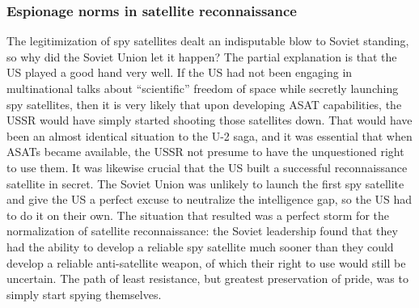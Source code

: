 \documentclass[14pt]{extarticle}
\begin{document}
\subsubsection{Espionage norms in satellite reconnaissance}
The legitimization of spy satellites dealt an indisputable blow to Soviet standing, so why did the Soviet Union let it happen? The partial explanation is that the US played a good hand very well. If the US had not been engaging in multinational talks about \enquote{scientific} freedom of space while secretly launching spy satellites, then it is very likely that upon developing ASAT capabilities, the USSR would have simply started shooting those satellites down. That would have been an almost identical situation to the U-2 saga, and it was essential that when ASATs became available, the USSR not presume to have the unquestioned right to use them. It was likewise crucial that the US built a successful reconnaissance satellite in secret. The Soviet Union was unlikely to launch the first spy satellite and give the US a perfect excuse to neutralize the intelligence gap, so the US had to do it on their own. The situation that resulted was a perfect storm for the normalization of satellite reconnaissance: the Soviet leadership found that they had the ability to develop a reliable spy satellite much sooner than they could develop a reliable anti-satellite weapon, of which their right to use would still be uncertain. The path of least resistance, but greatest preservation of pride, was to simply start spying themselves.

\end{document}
